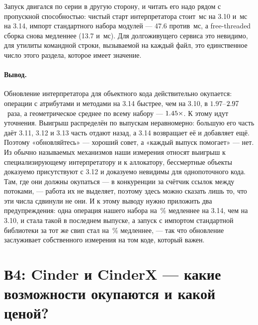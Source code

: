 Запуск двигался по серии в другую сторону, и читать его надо рядом с пропускной способностью: чистый старт интерпретатора стоит \,мс на 3.10 и \,мс на 3.14, импорт
стандартного набора модулей --- 47.6 против \,мс, а free-threaded сборка снова медленнее (13.7
и \,мс). Для долгоживущего сервиса это невидимо, для утилиты командной строки, вызываемой на
каждый файл, это единственное число этого раздела, которое имеет значение.

\paragraph{Вывод.} Обновление интерпретатора для объектного кода действительно окупается:
операции с атрибутами и методами на 3.14 быстрее, чем на 3.10, в $1.97$--$\meas{ratio:b3_runtime-v310:attr_set/v310|b3_runtime-v314:attr_set/v314}{2.97}$~раза, а
геометрическое среднее по всему набору --- $\meas{geomean:b3_runtime-v310|b3_runtime-v314}{1.45}\times$. К этому идут уточнения. Выигрыш
распределён по выпускам неравномерно: большую его часть даёт 3.11, 3.12 и 3.13 часть отдают
назад, а 3.14 возвращает её и добавляет ещё. Поэтому «обновляйтесь» --- хороший совет, а
«каждый выпуск помогает» --- нет. Из обычно называемых механизмов наши измерения относят выигрыш к
специализирующему интерпретатору и к аллокатору, бессмертные объекты доказуемо присутствуют с 3.12
и доказуемо невидимы для однопоточного кода. Там, где они должны окупаться --- в конкуренции за
счётчик ссылок между потоками, --- работа их не выделяет, поэтому здесь можно сказать лишь то, что
эти числа сдвинули не они.
И к этому выводу нужно приложить два предупреждения: одна операция нашего набора на \,\% медленнее на
3.14, чем на 3.10, и стала такой в последнем выпуске, а запуск с импортом стандартной библиотеки за
тот же свип стал на \,\% медленнее, --- так что обновление заслуживает собственного измерения на
том коде, который важен.

\section{В4: Cinder и CinderX --- какие возможности окупаются и какой ценой?}
\label{sec:rq4}

